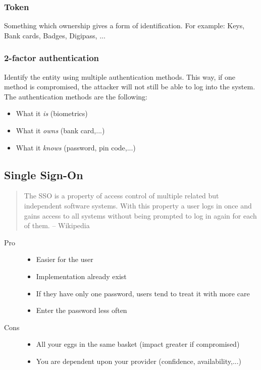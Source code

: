 \subsubsection{Token}
Something which ownership gives a form of identification.
For example: Keys, Bank cards, Badges, Digipass, ...

\subsubsection{2-factor authentication}
Identify the entity using multiple authentication methods.
This way, if one method is compromised, the attacker will not still be able to
log into the system.
The authentication methods are the following:
\begin{itemize}
\item What it \emph{is} (biometrics)
\item What it \emph{owns} (bank card,...)
\item What it \emph{knows} (password, pin code,...)
\end{itemize}

\subsection{Single Sign-On}
\begin{quote}
The SSO is a property of access control of multiple related but independent
software systems. With this property a user logs in once and gains access to
all systems without being prompted to log in again for each of them.
-- Wikipedia
\end{quote}

\begin{description}
\item[Pro]
\begin{itemize}
\item Easier for the user
\item Implementation already exist
\item If they have only one password, users tend to treat it with more care
\item Enter the password less often
\end{itemize}
\item[Cons]
\begin{itemize}
\item All your eggs in the same basket (impact greater if compromised)
\item You are dependent upon your provider (confidence, availability,...)
\end{itemize}
\end{description}

